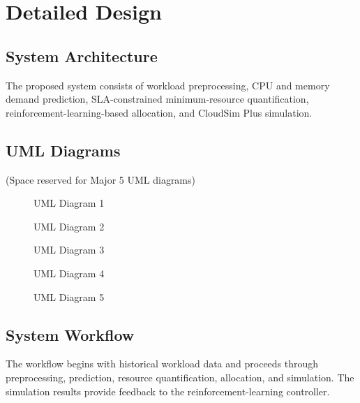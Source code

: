 \documentclass[12pt,a4paper]{report}
\begin{document}
\chapter{Detailed Design}
\section{System Architecture}
The proposed system consists of workload preprocessing, CPU and memory demand prediction, SLA-constrained minimum-resource quantification, reinforcement-learning-based allocation, and CloudSim Plus simulation. 
\lipsum[76-80]

\section{UML Diagrams}
(Space reserved for Major 5 UML diagrams)
\vspace{8cm} %
\begin{figure}[h]
    \centering
    \caption{UML Diagram 1}
\end{figure}
\vspace{8cm}
\begin{figure}[h]
    \centering
    \caption{UML Diagram 2}
\end{figure}
\vspace{8cm}
\begin{figure}[h]
    \centering
    \caption{UML Diagram 3}
\end{figure}
\vspace{8cm}
\begin{figure}[h]
    \centering
    \caption{UML Diagram 4}
\end{figure}
\vspace{8cm}
\begin{figure}[h]
    \centering
    \caption{UML Diagram 5}
\end{figure}
\lipsum[81-85]

\section{System Workflow}
The workflow begins with historical workload data and proceeds through preprocessing, prediction, resource quantification, allocation, and simulation. The simulation results provide feedback to the reinforcement-learning controller.
\lipsum[86-90]
\end{document}
